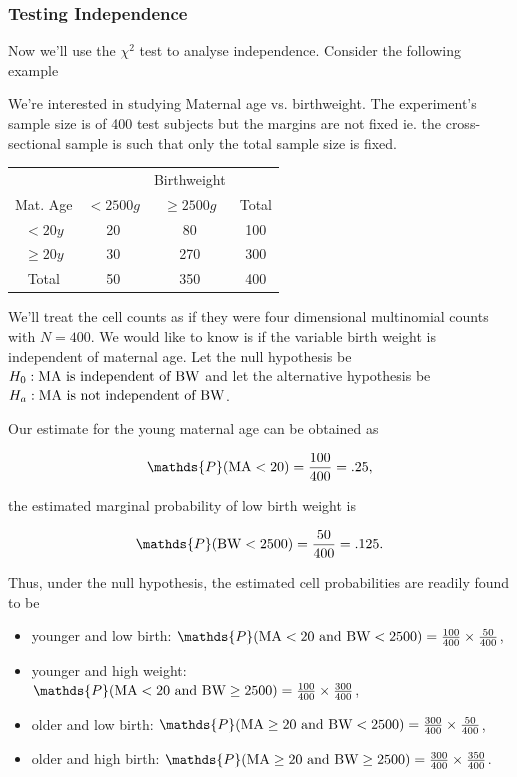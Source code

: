 \documentclass{homework}
\begin{document}
\clearpage

\subsubsection{Testing Independence}

Now we'll use the $\chi^2$ test to analyse independence. Consider the following example

\begin{tcolorbox}[title=Example 1 of Independence Testing]

We're interested in studying Maternal age vs. birthweight. The experiment's sample size is of 400 test subjects but the margins are not fixed ie. the cross-sectional sample is such that only the total sample size is fixed.

\begin{center}
\begin{tabular}{ |c|c|c|c| } 
 \hline
 & & Birthweight \\
 Mat. Age & $<2500g$ &  $\geq 2500g$ & Total \\ 
 $<20y$ & 20 & 80 & 100 \\ 
 $\geq 20y$ & 30 & 270 & 300 \\
 Total & 50 & 350 & 400
\end{tabular}
\end{center}

We'll treat the cell counts as if they were four dimensional multinomial counts with $N=400$. We would like to know is if the variable birth weight is independent of maternal age. Let the null hypothesis be $H_0: \textnormal{MA is independent of BW}$ and let the alternative hypothesis be $H_a: \textnormal{MA is not independent of BW}$. 

Our estimate for the young maternal age can be obtained as

$$
\mathds{P}(\textnormal{MA} < 20) = \frac{100}{400} = .25,
$$

the estimated marginal probability of low birth weight is 

$$
\mathds{P}(\textnormal{BW} < 2500) = \frac{50}{400} = .125.
$$

Thus, under the null hypothesis, the estimated cell probabilities are readily found to be

\begin{itemize}
    \item younger and low birth: $\mathds{P}(\textnormal{MA} < 20 \textnormal{ and } \textnormal{BW} < 2500) = \frac{100}{400} \times \frac{50}{400}$,
    \item younger and high weight: $\mathds{P}(\textnormal{MA} < 20 \textnormal{ and } \textnormal{BW} \geq 2500) =  \frac{100}{400}\times \frac{300}{400}$,
    \item older and low birth: $\mathds{P}(\textnormal{MA} \geq 20 \textnormal{ and } \textnormal{BW} < 2500) =  \frac{300}{400} \times \frac{50}{400}$,
    \item older and high birth: $\mathds{P}(\textnormal{MA} \geq 20 \textnormal{ and } \textnormal{BW} \geq 2500) =  \frac{300}{400} \times \frac{350}{400}$.
\end{itemize}


\end{tcolorbox}
\end{document}
